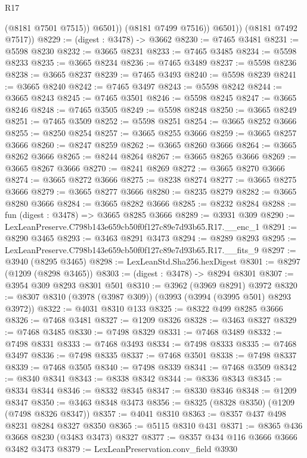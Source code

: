 \begin{lexlean}{R17}
\begin{coremodule}
                  (@8181 @7501 @7515))
                @6501))
            (@8181 @7499 @7516))
          @6501))
      (@8181 @7492 @7517))
@8229 := (digest : @3478) -> @3662
@8230 := @7465 @3481
@8231 := @5598 @8230
@8232 := @3665 @8231
@8233 := @7465 @3485
@8234 := @5598 @8233
@8235 := @3665 @8234
@8236 := @7465 @3489
@8237 := @5598 @8236
@8238 := @3665 @8237
@8239 := @7465 @3493
@8240 := @5598 @8239
@8241 := @3665 @8240
@8242 := @7465 @3497
@8243 := @5598 @8242
@8244 := @3665 @8243
@8245 := @7465 @3501
@8246 := @5598 @8245
@8247 := @3665 @8246
@8248 := @7465 @3505
@8249 := @5598 @8248
@8250 := @3665 @8249
@8251 := @7465 @3509
@8252 := @5598 @8251
@8254 := @3665 @8252 @3666
@8255 := @8250 @8254
@8257 := @3665 @8255 @3666
@8259 := @3665 @8257 @3666
@8260 := @8247 @8259
@8262 := @3665 @8260 @3666
@8264 := @3665 @8262 @3666
@8265 := @8244 @8264
@8267 := @3665 @8265 @3666
@8269 := @3665 @8267 @3666
@8270 := @8241 @8269
@8272 := @3665 @8270 @3666
@8274 := @3665 @8272 @3666
@8275 := @8238 @8274
@8277 := @3665 @8275 @3666
@8279 := @3665 @8277 @3666
@8280 := @8235 @8279
@8282 := @3665 @8280 @3666
@8284 := @3665 @8282 @3666
@8285 := @8232 @8284
@8288 := fun (digest : @3478) => @3665 @8285 @3666
@8289 := @3931 @309
@8290 := LexLeanPreserve.C798b143e659cb50f0f127c89e7d93b65.R17.__enc_1
@8291 := @8290 @3465
@8293 := @3463 @8291 @3473
@8294 := @8289 @8293
@8295 := LexLeanPreserve.C798b143e659cb50f0f127c89e7d93b65.R17.__fits_9
@8297 := @3940 (@8295 @3465)
@8298 := LexLeanStd.Sha256.hexDigest
@8301 := @8297 (@1209 (@8298 @3465))
@8303 := (digest : @3478) -> @8294 @8301
@8307 := @3954 @309 @8293 @8301 @501
@8310 := @3962 (@3969 @8291) @3972
@8320 := @8307 @8310 (@3978 (@3987 @309)) (@3993 (@3994 (@3995 @501) @8293 @3972))
@8322 := @4031 @8310 @133
@8325 := @8322 @499 @8285 @3666
@8326 := @7468 @3481
@8327 := @1209 @8326
@8328 := @3463 @8327
@8329 := @7468 @3485
@8330 := @7498 @8329
@8331 := @7468 @3489
@8332 := @7498 @8331
@8333 := @7468 @3493
@8334 := @7498 @8333
@8335 := @7468 @3497
@8336 := @7498 @8335
@8337 := @7468 @3501
@8338 := @7498 @8337
@8339 := @7468 @3505
@8340 := @7498 @8339
@8341 := @7468 @3509
@8342 := @8340 @8341
@8343 := @8338 @8342
@8344 := @8336 @8343
@8345 := @8334 @8344
@8346 := @8332 @8345
@8347 := @8330 @8346
@8348 := @1209 @8347
@8350 := @3463 @8348 @3473
@8356 := @8325 (@8328 @8350) (@1209 (@7498 @8326 @8347))
@8357 := @4041 @8310
@8363 := @8357 @437 @498 @8231 @8284 @8327 @8350
@8365 := @5115 @8310 @431
@8371 := @8365 @436 @3668 @8230 (@3483 @3473) @8327
@8377 := @8357 @434 @116 @3666 @3666 @3482 @3473
@8379 := LexLeanPreservation.conv_field @3930

\end{coremodule}
\end{lexlean}
